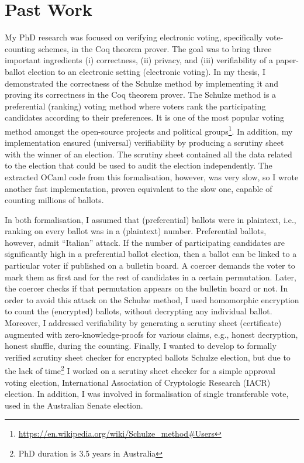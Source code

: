 \documentclass[a4paper]{article}
\begin{document}
\section{Past Work}
My PhD research was focused on verifying electronic voting, specifically vote-counting schemes, in 
the Coq theorem prover. The goal was to 
bring  three important ingredients (i) correctness, (ii) privacy, and (iii) verifiability of a 
paper-ballot election to 
an electronic setting (electronic voting).
In my thesis, I demonstrated the correctness of the Schulze method 
by implementing it and proving its correctness in the Coq theorem 
prover. The Schulze method is a preferential (ranking) voting method where voters rank the participating 
candidates according to their preferences. It is one of the most popular voting method amongst the open-source projects and 
political groups\footnote{\url{https://en.wikipedia.org/wiki/Schulze_method#Users}}.
In addition, my implementation 
ensured (universal) verifiability by producing a scrutiny sheet 
with the winner of an election. The scrutiny sheet contained all the data related 
to the election that could be used to audit the election independently. 
The extracted OCaml code from this formalisation, however, was 
very slow, so I wrote another fast implementation, proven equivalent to the slow one,
capable of counting millions of ballots.

In both formalisation, I assumed that (preferential) ballots were in plaintext, i.e., 
ranking on every ballot was in a (plaintext) number.  Preferential ballots, 
however, admit ``Italian'' attack. 
If the number of participating candidates are significantly high in 
a preferential ballot election,
then a ballot can be linked to a particular voter if published on a bulletin board.
A coercer demands the voter to mark them as first and for the rest of candidates
in a certain permutation. Later, the coercer checks if that permutation appears 
on the bulletin board or not. In order to
avoid this attack on the Schulze method, I used homomorphic encryption to count the (encrypted) ballots, without decrypting 
any individual ballot. Moreover, I addressed verifiability by generating a scrutiny sheet (certificate) 
augmented with zero-knowledge-proofs for various claims, e.g., honest decryption, honest shuffle,  
during the counting. 
Finally, I wanted to develop to formally 
verified scrutiny sheet checker for encrypted ballots Schulze election, but due to the lack of 
time\footnote{PhD duration is 3.5 years in Australia} I worked on a scrutiny sheet checker for a simple approval voting election,
International Association of Cryptologic Research (IACR) election.
In addition, I was involved in formalisation of single transferable vote, used in the Australian Senate election.
\end{document}
